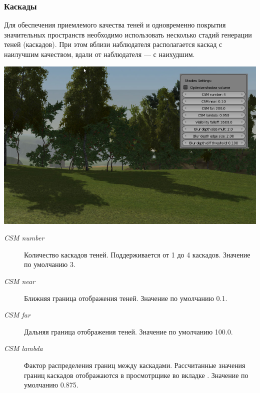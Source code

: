 \documentclass[a4paper,12pt,oneside]{sphinxmanual}
\begin{document}
\subsubsection{Каскады}
\label{lighting:id11}
Для обеспечения приемлемого качества теней и одновременно покрытия значительных пространств необходимо использовать несколько стадий генерации теней (каскадов). При этом вблизи наблюдателя располагается каскад с наилучшим качеством, вдали от наблюдателя — с наихудшим.

{\hfill\includegraphics[width=1.000\linewidth]{shadow_cascades.jpg}\hfill}

\begin{DUlineblock}{0em}
\item[] 
\end{DUlineblock}
\begin{description}
\item[{\emph{CSM number}}] \leavevmode
Количество каскадов теней. Поддерживается от 1 до 4 каскадов. Значение по умолчанию 3.

\item[{\emph{CSM near}}] \leavevmode
Ближняя граница отображения теней. Значение по умолчанию 0.1.

\item[{\emph{CSM far}}] \leavevmode
Дальняя граница отображения теней. Значение по умолчанию 100.0.

\item[{\emph{CSM lambda}}] \leavevmode
Фактор распределения границ между каскадами. Рассчитанные значения границ каскадов отображаются в просмотрщике во вкладке . Значение по умолчанию 0.875.

\end{description}
\end{document}
